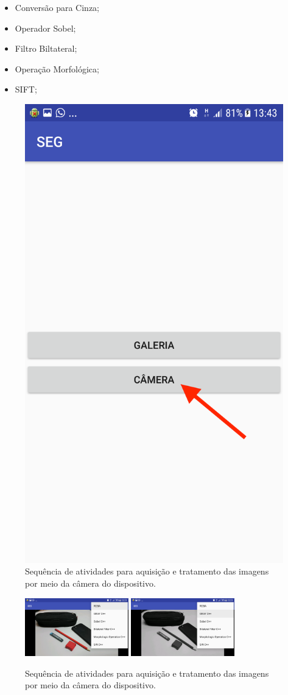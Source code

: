 \begin{itemize}
    \item Conversão para Cinza;
    \item Operador Sobel;
    \item Filtro Biltateral;
    \item Operação Morfológica;
    \item SIFT;
\end{itemize}
  \begin{figure}[!htb]
       \begin{center}  
          \includegraphics[width=0.4\columnwidth]{img/camera_app_n1.png}
           \caption{\label{fig:camera_app_p1}Sequência de atividades para aquisição e tratamento das imagens por meio da câmera do dispositivo.}
       \end{center}
   \end{figure}
\begin{figure}[!htb]
 \centering
 \def\baselinestretch{1}\small\normalsize
 \includegraphics[width=0.4\textwidth]{img/camera_app_n2.png}\qquad
 \includegraphics[width=0.4\textwidth]{img/camera_app_n3.png} 
 \caption{\label{fig:camera_app_p2}Sequência de atividades para aquisição e tratamento das imagens por meio da câmera do dispositivo.}
\end{figure}
